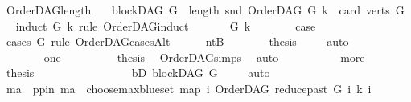 \begin{isabellebody}
\isanewline
{}\isamarkupfalse%
\ OrderDAG{\isacharunderscore}{\kern0pt}length{\isacharcolon}{\kern0pt}\isanewline
\ \ \ {\isachardoublequoteopen}blockDAG\ G\ {\isasymLongrightarrow}\ length\ {\isacharparenleft}{\kern0pt}snd\ {\isacharparenleft}{\kern0pt}OrderDAG\ G\ k{\isacharparenright}{\kern0pt}{\isacharparenright}{\kern0pt}\ {\isacharequal}{\kern0pt}\ card\ {\isacharparenleft}{\kern0pt}verts\ G{\isacharparenright}{\kern0pt}{\isachardoublequoteclose}\isanewline
%
\isadelimproof
\ \ %
\endisadelimproof
%
\isatagproof
{}\isamarkupfalse%
{\isacharparenleft}{\kern0pt}induct\ G\ k\ rule{\isacharcolon}{\kern0pt}\ OrderDAG{\isachardot}{\kern0pt}induct{\isacharparenright}{\kern0pt}\isanewline
\ \ \ \ \isamarkupfalse%
\ {\isacharparenleft}{\kern0pt}{}\ G\ k{\isacharparenright}{\kern0pt}\isanewline
\ \ \ \ \isamarkupfalse%
\ \isamarkupfalse%
\ {\isacharquery}{\kern0pt}case\ \isamarkupfalse%
\ {\isacharparenleft}{\kern0pt}cases\ G\ rule{\isacharcolon}{\kern0pt}\ OrderDAG{\isacharunderscore}{\kern0pt}casesAlt{\isacharparenright}{\kern0pt}\isanewline
\ \ \ \ \isamarkupfalse%
\ ntB\isanewline
\ \ \ \ \isamarkupfalse%
\ \isamarkupfalse%
\ {\isacharquery}{\kern0pt}thesis\ \isamarkupfalse%
\ {}\ \isamarkupfalse%
\ auto\isanewline
\ \ \ \ \isamarkupfalse%
\isanewline
\ \ \ \ \ \ \isamarkupfalse%
\ one\isanewline
\ \ \ \ \ \ \isamarkupfalse%
\ \isamarkupfalse%
\ {\isacharquery}{\kern0pt}thesis\ \isamarkupfalse%
\ OrderDAG{\isachardot}{\kern0pt}simps\ \isamarkupfalse%
\ auto\isanewline
\ \ \ \ \isamarkupfalse%
\isanewline
\ \ \ \ \isamarkupfalse%
\ more\isanewline
\ \ \ \ \isamarkupfalse%
\ {\isacharquery}{\kern0pt}thesis\ \isamarkupfalse%
\ {}\isanewline
\ \ \ \ \isamarkupfalse%
\ {\isacharminus}{\kern0pt}\isanewline
\ \ \ \ \ \ \isamarkupfalse%
\ bD{\isacharcolon}{\kern0pt}\ {\isachardoublequoteopen}blockDAG\ G{\isachardoublequoteclose}\ \isamarkupfalse%
\ {}\ \isamarkupfalse%
\ auto\isanewline
\ \ \ \ \ \ \isamarkupfalse%
\ ma\ \ pp{\isacharunderscore}{\kern0pt}in{\isacharcolon}{\kern0pt}\ {\isachardoublequoteopen}ma\ {\isacharequal}{\kern0pt}\ {\isacharparenleft}{\kern0pt}choose{\isacharunderscore}{\kern0pt}max{\isacharunderscore}{\kern0pt}blue{\isacharunderscore}{\kern0pt}set\ {\isacharparenleft}{\kern0pt}map\ {\isacharparenleft}{\kern0pt}{\isasymlambda}i{\isachardot}{\kern0pt}\ {\isacharparenleft}{\kern0pt}OrderDAG\ {\isacharparenleft}{\kern0pt}reduce{\isacharunderscore}{\kern0pt}past\ G\ i{\isacharparenright}{\kern0pt}\ k{\isacharcomma}{\kern0pt}\ i{\isacharparenright}{\kern0pt}{\isacharparenright}{\kern0pt}\isanewline

\end{isabellebody}
